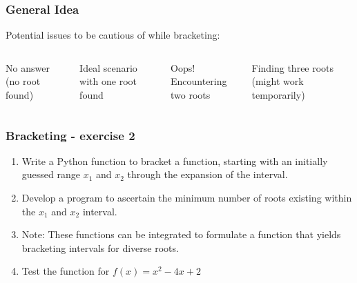 {\nologo
\begin{frame}[fragile]
  \frametitle{General Idea}
  Potential issues to be cautious of while bracketing:
  \begin{columns}
    \vspace{0.01cm}
    \newline
    No answer (no root found)
    \vspace{0.8cm}

    \vspace{0.01cm}
    \newline
    Ideal scenario with one root found
    \vspace{0.8cm}

    \vspace{0.01cm}
    \newline
    Oops! Encountering two roots
    \vspace{0.8cm}

    \vspace{0.01cm}
    \newline
    Finding three roots (might work temporarily)
    \vspace{0.8cm}
  \end{columns}
\end{frame}
}

\begin{frame}[fragile,label=practice_nonlin2]
  \frametitle{Bracketing - exercise 2}
  \begin{enumerate}
    \item Write a Python function to bracket a function, starting with an initially guessed range \(x_1\) and \(x_2\) through the expansion of the interval.
    \item Develop a program to ascertain the minimum number of roots existing within the \(x_1\) and \(x_2\) interval.
    \item Note: These functions can be integrated to formulate a function that yields bracketing intervals for diverse roots.
    \item Test the function for \( f(x) = x^2 -4x +2 \)
  \end{enumerate}
\end{frame}

